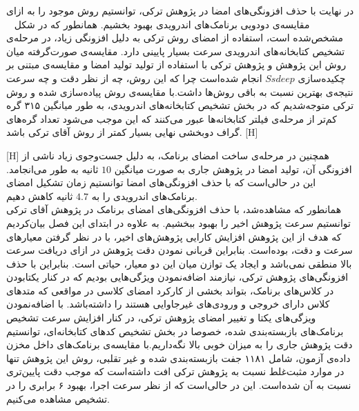  در نهایت با حذف افزونگی‌های امضا در پژوهش ترکی، توانستیم روش موجود را به ازای مقایسه‌ی دودویی برنامک‌های اندرویدی بهبود بخشیم. همانطور که در شکل ~ مشخص‌شده است، استفاده از امضای روش ترکی به دلیل افزونگی زیاد، در مرحله‌ی تشخیص کتابخانه‌های اندرویدی سرعت بسیار پایینی دارد. مقایسه‌ی صورت‌گرفته میان روش‌ این پژوهش و پژوهش ترکی با استفاده از تولید تولید امضا و مقایسه‌ی مبتنی بر چکیده‌سازی $Ssdeep$ انجام شده‌است چرا که این روش، چه از نظر دقت و چه سرعت نتیجه‌ی بهترین نسبت به باقی روش‌ها داشت.با مقایسه‌ی روش‌ پیاده‌سازی شده و روش ترکی متوجه‌شدیم که در بخش تشخیص کتابخانه‌های اندرویدی، به طور میانگین ۳۱۵ گره کم‌تر از مرحله‌ی فیلتر کتابخانه‌ها عبور می‌کنند که این موجب می‌شود تعداد گره‌های گراف دوبخشی نهایی بسیار کمتر از روش آقای ترکی باشد.
  [H]
 \vspace{1em}

 

 
   [H]
 \vspace{1em}
همچنین در مرحله‌ی ساخت امضای برنامک، به دلیل جست‌و‌جوی زیاد ناشی از افزونگی آن، تولید امضا در پژوهش جاری به صورت میانگین $10$ ثانیه به طور می‌انجامد. این در حالی‌است که با حذف افزونگی‌های امضا توانستیم زمان تشکیل امضای برنامک‌های اندرویدی را به $4.7$ ثانیه کاهش دهیم. \\
 همانطور که مشاهده‌شد، با حذف افزونگی‌های امضا‌ی برنامک در پژوهش آقای ترکی توانستیم سرعت پژوهش اخیر را بهبود ببخشیم. به علاوه در ابتدای این فصل بیان‌کردیم که هدف از این پژوهش افزایش کارایی پژوهش‌های اخیر، با در نظر گرفتن معیار‌های سرعت و دقت، بوده‌است. بنابراین قربانی نمودن دقت پژوهش در ازای دریافت سرعت بالا منطقی نمی‌باشد و ایجاد یک توازن میان این دو معیار، حیاتی است. بنابراین با حذف افزونگی‌های پژوهش ترکی، نیازمند اضافه‌نمودن ویژگی‌هایی بودیم که در کنار یکتابودن در کلاس‌های برنامک، بتواند بخشی از کارکرد امضای کلاسی در مواقعی که متد‌های کلاس دارای خروجی و ورودی‌های غیرجاوایی هستند را داشته‌باشد. با اضافه‌نمودن ویزگی‌های یکتا و تغییر امضای‌ پژوهش ترکی، در کنار افزایش سرعت تشخیص برنامک‌های بازبسته‌بندی شده، خصوصا در بخش تشخیص کد‌های کتابخانه‌ای، توانستیم دقت پژوهش جاری را به میزان خوبی بالا نگه‌داریم.با مقایسه‌ی برنامک‌های داخل مخزن داده‌ی آزمون، شامل ۱۱۸۱ جفت بازبسته‌بندی شده و غیر تقلبی، روش این پژوهش تنها در موارد مثبت‌غلط نسبت به پژوهش ترکی افت داشته‌است که موجب دقت پایین‌تری نسبت به آن شده‌است. این در حالی‌است که از نظر سرعت اجرا، بهبود ۶ برابری را در تشخیص مشاهده می‌کنیم.\\
 
